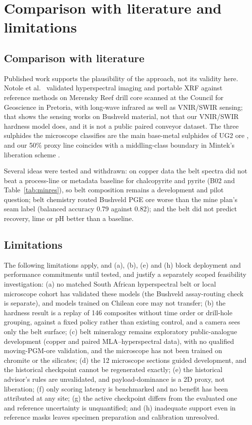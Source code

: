 \documentclass[10pt,a4paper,twocolumn]{article}
\begin{document}
\section{Comparison with literature and limitations}

\subsection{Comparison with literature}

Published work supports the plausibility of the approach, not its validity here. Notole et al.\ \cite{notole2025} validated hyperspectral imaging and portable XRF against reference methods on Merensky Reef drill core scanned at the Council for Geoscience in Pretoria, with long-wave infrared as well as VNIR/SWIR sensing; that shows the sensing works on Bushveld material, not that our VNIR/SWIR hardness model does, and it is not a public paired conveyor dataset. The three sulphides the microscope classifies are the main base-metal sulphides of UG2 ore \cite{jones2005}, and our 50\% proxy line coincides with a middling-class boundary in Mintek's liberation scheme \cite{moodley2026}.

Several ideas were tested and withdrawn: on copper data the belt spectra did not beat a process-line or metadata baseline for chalcopyrite and pyrite (B02 and Table~\ref{tab:minres}), so belt composition remains a development and pilot question; belt chemistry routed Bushveld PGE ore worse than the mine plan's seam label (balanced accuracy 0.79 against 0.82); and the belt did not predict recovery, lime or pH better than a baseline.

\subsection{Limitations}

The following limitations apply, and (a), (b), (e) and (h) block deployment and performance commitments until tested, and justify a separately scoped feasibility investigation: (a) no matched South African hyperspectral belt or local microscope cohort has validated these models (the Bushveld assay-routing check is separate), and models trained on Chilean core may not transfer; (b) the hardness result is a replay of 146 composites without time order or drill-hole grouping, against a fixed policy rather than existing control, and a camera sees only the belt surface; (c) belt mineralogy remains exploratory public-analogue development (copper and paired MLA--hyperspectral data), with no qualified moving-PGM-ore validation, and the microscope has not been trained on chromite or the silicates; (d) the 12 microscope sections guided development, and the historical checkpoint cannot be regenerated exactly; (e) the historical advisor's rules are unvalidated, and payload-dominance is a 2D proxy, not liberation; (f) only scoring latency is benchmarked and no benefit has been attributed at any site; (g) the active checkpoint differs from the evaluated one and reference uncertainty is unquantified; and (h) inadequate support even in reference masks leaves specimen preparation and calibration unresolved.
\end{document}
